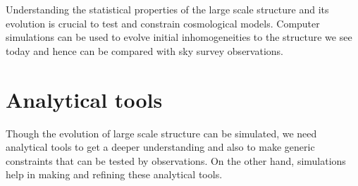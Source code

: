 \documentclass[12pt]{article}
\begin{document}
Understanding the statistical properties of the large scale structure and its evolution is crucial to test and constrain cosmological models. Computer simulations can be used to evolve initial inhomogeneities to the structure we see today and hence can be compared with sky survey observations.


\section{Analytical tools}
Though the evolution of large scale structure can be simulated, we need analytical tools to get a deeper understanding and also to make generic constraints that can be tested by observations. On the other hand, simulations help in making and refining these analytical tools. 
\end{document}
